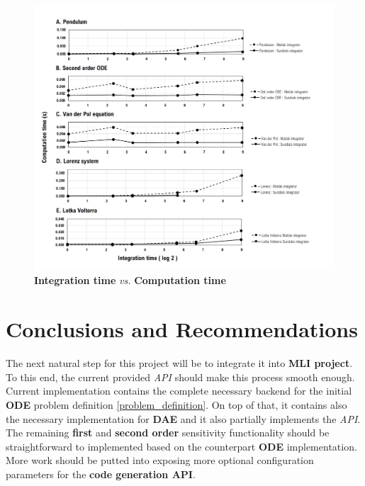 \documentclass[12pt, letterpaper]{article}
\begin{document}
\begin{figure}[h!]
    \centering
    \includegraphics[scale=0.8]{images/chart.png}
    \caption{ \textbf{Integration time} \textit{vs.} \textbf{Computation time}}
    \label{label_chart}
\end{figure}


\section{Conclusions and Recommendations}
\label{conclusions_recommandations}
The next natural step for this project will be to integrate it into \textbf{MLI project}. To this end, the current provided \textit{API} should make this process smooth enough. Current implementation contains the complete necessary backend for the initial \textbf{ODE} problem  definition \ref{problem_definition}. On top of that, it contains also the necessary implementation for \textbf{DAE} and it also partially implements the \textit{API}. The remaining \textbf{first} and \textbf{second order} sensitivity functionality should be straightforward to implemented based on the counterpart \textbf{ODE} implementation.
More work should be putted into exposing more optional configuration parameters for the \textbf{code generation API}.

%






\end{document}
